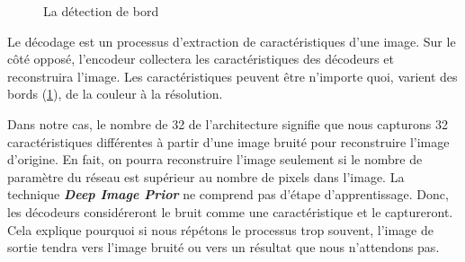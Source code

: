 \documentclass[
  11pt,
  dvipsnames]{article}
\begin{document}
\begin{figure}

{\centering {}

}

\caption{La détection de bord}\label{fig:compare-with-edge}
\end{figure}

Le décodage est un processus d'extraction de caractéristiques d'une image.
Sur le côté opposé, l'encodeur collectera les caractéristiques des décodeurs
et reconstruira l'image. Les caractéristiques peuvent être n'importe quoi,
varient des bords (\ref{fig:compare-with-edge}), de la couleur à la résolution.

Dans notre cas, le nombre de 32 de l'architecture signifie que nous capturons 32
caractéristiques différentes à partir d'une image bruité pour reconstruire
l'image d'origine. En fait, on pourra reconstruire l'image seulement si le nombre
de paramètre du réseau est supérieur au nombre de pixels dans l'image. La technique
\textbf{\emph{Deep Image Prior}} ne comprend pas d'étape d'apprentissage. Donc, les décodeurs
considéreront le bruit comme une caractéristique et le captureront.
Cela explique pourquoi si nous répétons le processus trop souvent, l'image de
sortie tendra vers l'image bruité ou vers un résultat que nous n'attendons pas.
\end{document}
